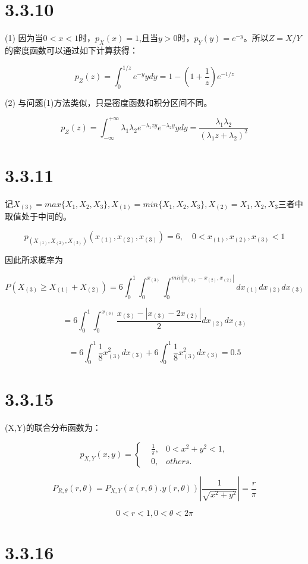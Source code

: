 \documentclass{article}
\begin{document}
\section{3.3.10}

(1)
因为当$0<x<1$时，$p_X(x)=1$,且当$y>0$时，$p_Y(y)=e^{-y}$。所以$Z=X/Y$的密度函数可以通过如下计算获得：

$$p_Z(z)=\int^{1/z}_0e^{-y}ydy=1-(1+\frac1z)e^{-1/z}$$

(2)
与问题(1)方法类似，只是密度函数和积分区间不同。

$$p_Z(z)=\int^{+\infty}_{-\infty}\lambda_1\lambda_2e^{-\lambda_1zy}e^{-\lambda_2y}ydy=\frac{\lambda_1\lambda_2}{(\lambda_1z+\lambda_2)^2}$$



\section{3.3.11}

记$X_(3)=max\{X_1,X_2,X_3\},X_{(1)}=min\{X_1,X_2,X_3\},X_{(2)}=X_1,X_2,X_3$三者中取值处于中间的。

$$p_{(X_{(1)},X_{(2)},X_{(3)})}(x_{(1)},x_{(2)},x_{(3)})=6,\quad0<x_{(1)},x_{(2)},x_{(3)}<1$$

因此所求概率为

$$P(X_{(3)}\geq X_{(1)}+X_{(2)})=6\int^1_0\int^{x_{(3)}}_0\int^{min|x_{(3)}-x_{(2)},x_{(2)}|}_0dx_{(1)}dx_{(2)}dx_{(3)}$$

$$=6\int^1_0\int^{x_{(3)}}_0\frac{x_{(3)}-|x_{(3)}-2x_{(2)}|}{2}dx_{(2)}dx_{(3)}$$

$$=6\int_0^1\frac18x^2_{(3)}dx_{(3)}+6\int_0^1\frac18x_{(3)}^2dx_{(3)}=0.5$$


\section{3.3.15}

(X,Y)的联合分布函数为：


\begin{equation}
p_{X,Y}(x,y)=\left\{
\begin{aligned}
&\frac1\pi,&0< x^2+y^2<1,\\
&0,&others.
\end{aligned}
\right.
\end{equation}

$$P_{R,\theta}(r,\theta)=P_{X,Y}(x(r,\theta).y(r,\theta)) |\frac{1}{\sqrt{x^2+y^2}}|=\frac r\pi$$

$$0<r<1,0<\theta<2\pi$$


\section{3.3.16}
\end{document}
